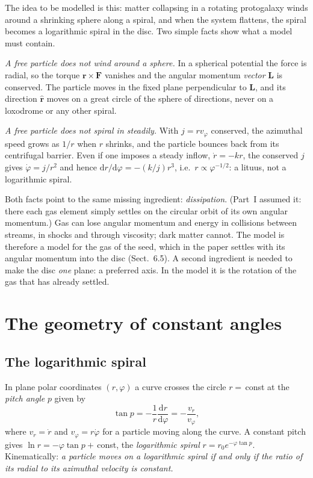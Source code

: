 \documentclass[11pt,a4paper]{article}
\newcommand{\dd}{\mathrm{d}}
\begin{document}
The idea to be modelled is this: matter collapsing in a rotating protogalaxy winds
around a shrinking sphere along a spiral, and when the system flattens, the spiral
becomes a logarithmic spiral in the disc. Two simple facts show what a model must
contain.

\emph{A free particle does not wind around a sphere.} In a spherical potential the
force is radial, so the torque $\mathbf r\times\mathbf F$ vanishes and the angular
momentum \emph{vector} $\mathbf L$ is conserved. The particle moves in the fixed plane
perpendicular to $\mathbf L$, and its direction $\hat{\mathbf r}$ moves on a great
circle of the sphere of directions, never on a loxodrome or any other spiral.

\emph{A free particle does not spiral in steadily.} With $j=r v_\varphi$ conserved,
the azimuthal speed grows as $1/r$ when $r$ shrinks, and the particle bounces back
from its centrifugal barrier. Even if one imposes a steady inflow, $\dot r=-kr$, the
conserved $j$ gives $\dot\varphi=j/r^2$ and hence $\dd r/\dd\varphi=-(k/j)r^3$, i.e.\
$r\propto\varphi^{-1/2}$: a lituus, not a logarithmic spiral.

Both facts point to the same missing ingredient: \emph{dissipation}. (Part~I
assumed it: there each gas element simply settles on the circular orbit of its own
angular momentum.) Gas can lose
angular momentum and energy in collisions between streams, in shocks and through
viscosity; dark matter cannot. The model is therefore a model for the gas of the
seed, which in the paper settles with its angular momentum into the disc
(Sect.~6.5). A second ingredient is needed to make the disc \emph{one} plane: a
preferred axis. In the model it is the rotation of the gas that has already
settled.

\section{The geometry of constant angles}

\subsection{The logarithmic spiral}
In plane polar coordinates $(r,\varphi)$ a curve crosses the circle $r=$\,const at
the \emph{pitch angle} $p$ given by
\begin{equation}
  \tan p=-\frac{1}{r}\frac{\dd r}{\dd\varphi}=-\frac{v_r}{v_\varphi},
  \label{eq:pitch}
\end{equation}
where $v_r=\dot r$ and $v_\varphi=r\dot\varphi$ for a particle moving along the
curve. A constant pitch gives $\ln r=-\varphi\tan p+$\,const, the
\emph{logarithmic spiral} $r=r_0e^{-\varphi\tan p}$. Kinematically: \emph{a particle
moves on a logarithmic spiral if and only if the ratio of its radial to its
azimuthal velocity is constant.}
\end{document}
